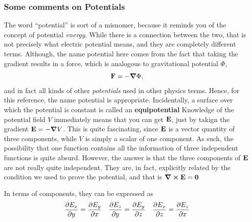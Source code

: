 	\subsubsection{Some comments on Potentials}
			The word ``potential'' is sort of a misnomer, because it reminds you of the concept
			of potential \textit{energy}. While there is a connection between the two, that
			is not precisely what electric potential means, and they are completely different terms.
			Although, the name potential here comes from the fact that taking the gradient
			results in a force, which is analogous to gravitational potential $\Phi$,
			\[
				\vb{F} = -\grad\Phi,
			\]
			and in fact all kinds of other \textit{potentials} used in other physics terms. Hence, for this reference, the name potential is appropriate.
			Incidentally, a surface over which the potential is constant is called an \textbf{equipotential}
			Knowledge of the potential field $V$ immediately means that you can get $\vb E$, just by takign the gradient $\vb E = -\grad V$.
			This is quite fascinating, since $\vb E$ is a vector quantity of three components, while $V$ is simply a scalar of one
			component. As such, the possibility that one function contains all the information of three independent functions is
			quite absurd. However, the answer is that the three components of $\vb E$ are not really quite independent.
			They are, in fact, explicitly related by the condition we used to prove the potential, and that is $\curl\vb E = \vb{0}$

			In terms of components, they can be expressed as
			\begin{align*}
				\pdv{E_x}{y}=\pdv{E_y}{x}&&
				\pdv{E_z}{y}=\pdv{E_y}{z}&&
				\pdv{E_x}{z}=\pdv{E_z}{x}
			\end{align*}

